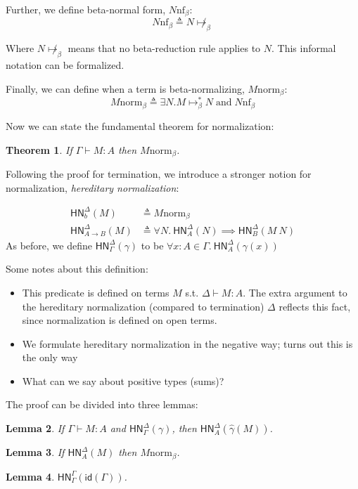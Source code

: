 \documentclass{article}
\newtheorem{thm}{Theorem}
\newtheorem{lem}[thm]{Lemma}
\newcommand{\hasEF}[3]{\ensuremath{#1 \vdash #2 : #3}}
\newcommand{\bnf}[1]{#1 \mathrel{\text{nf}_\beta}}
\newcommand{\bnorm}[1]{\ensuremath{#1 \mathrel{\text{norm}_\beta}}}
\newcommand{\stepbs}[2]{\ensuremath{#1 \mapsto_{\beta}^* #2}}
\newcommand{\hnorm}[3]{\ensuremath{\mathsf{HN}^{#1}_{#2}(#3)}}
\newcommand{\id}[1]{\ensuremath{\mathsf{id}(#1)}}
\newcommand{\fn}[2]{\ensuremath{#1 \to #2}}
\newcommand{\ap}[2]{\ensuremath{#1\ #2}}
\begin{document}
Further, we define beta-normal form, $\bnf{N}$:
\[
\bnf{N} \triangleq N \not\mapsto_{\beta}
\]

Where $N \not\mapsto_{\beta}$ means that no beta-reduction rule applies to $N$. This informal notation can be formalized.

Finally, we can define when a term is beta-normalizing, $\bnorm{M}$: 
\[
\bnorm{M} \triangleq \exists N. \stepbs{M}{N} \;\text{and}\; \bnf{N}
\]

Now we can state the fundamental theorem for normalization: 
\begin{thm}
If $\hasEF{\Gamma}{M}{A}$ then $\bnorm{M}$.
\end{thm}

Following the proof for termination, we introduce a stronger notion for normalization, \emph{hereditary normalization}:

\begin{align*}
  \hnorm{\Delta}{b}{M} &\triangleq \bnorm{M}\\
  \hnorm{\Delta}{\fn{A}{B}}{M} &\triangleq
  \forall N.\ \hnorm{\Delta}{A}{N} \implies \hnorm{\Delta}{B}{\ap{M}{N}}
\end{align*}
As before, we define $\hnorm{\Delta}{\Gamma}{\gamma}$ to be $\forall x : A \in \Gamma.\ \hnorm{\Delta}{A}{\gamma(x)}$

Some notes about this definition:
\begin{itemize}
\setlength\itemsep{1em}
\item This predicate is defined on terms $M$ s.t. $\hasEF{\Delta}{M}{A}$. The extra argument to the hereditary normalization (compared to termination) $\Delta$ reflects this fact, since normalization is defined on open terms.
\item We formulate hereditary normalization in the negative way; turns out this is the only way
\item What can we say about positive types (sums)?
\end{itemize}

The proof can be divided into three lemmas: 
\begin{lem}\label{l1}
If $\hasEF{\Gamma}{M}{A}$ and $\hnorm{\Delta}{\Gamma}{\gamma}$, then $\hnorm{\Delta}{A}{\hat\gamma(M)}$.
\end{lem}

\begin{lem}\label{l2}
If $\hnorm{\Delta}{A}{M}$ then $\bnorm{M}$.
\end{lem}

\begin{lem}\label{l3}
$\hnorm{\Gamma}{\Gamma}{\id{\Gamma}}$.
\end{lem}
\end{document}
